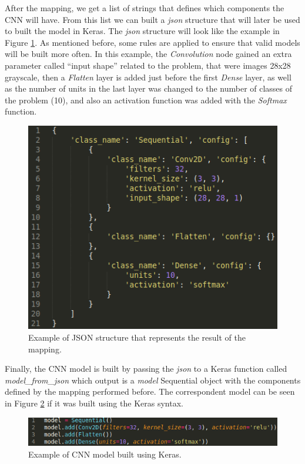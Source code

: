 \documentclass[12pt]{article}
\begin{document}
After the mapping, we get a list of strings that defines which components the CNN will have. From this list we can built a \textit{json} structure that will later be used to built the model in Keras. The \textit{json} structure will look like the example in Figure \ref{fig:json-example}. As mentioned before, some rules are applied to ensure that valid models will be built more often. In this example, the \textit{Convolution} node gained an extra parameter called ``input shape'' related to the problem, that were images 28x28 grayscale, then a \textit{Flatten} layer is added just before the first \textit{Dense} layer, as well as the number of units in the last layer was changed to the number of classes of the problem (10), and also an activation function was added with the \textit{Softmax} function.


\begin{figure}[!htb]
	\includegraphics[width=\linewidth]{images/json-example.png}
	\caption{Example of JSON structure that represents the result of the mapping.}
	\label{fig:json-example}
\end{figure}


Finally, the CNN model is built by passing the \textit{json} to a Keras function called \textit{model\_from\_json} which output is a \textit{model} Sequential object with the components defined by the mapping performed before. The correspondent model can be seen in Figure \ref{fig:model-example} if it was built using the Keras syntax.


\begin{figure}[!htb]
	\includegraphics[width=\linewidth]{images/model-example.png}
	\caption{Example of CNN model built using Keras.}
	\label{fig:model-example}
\end{figure}
\end{document}
